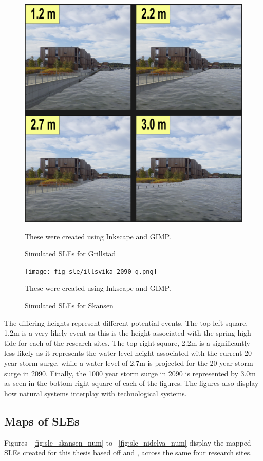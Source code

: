\begin{figure}[H]
    \centering
    \includegraphics[width=16cm]{fig_sle/grillstad 2090 q.png}
    \caption{Simulated SLEs for Grillstad}{These were created using Inkscape and GIMP. }
    \label{fig:SLE-grillstad}
\end{figure}

\begin{figure}[H]
    \centering
    \texttt{[image: fig\_sle/illsvika 2090 q.png]}
    \caption{Simulated SLEs for Skansen}{These were created using Inkscape and GIMP. }
    \label{fig:sle-skansen}
\end{figure}


The differing heights represent different potential events. The top left square, 1.2m is a very likely event as this is the height associated with the spring high tide for each of the research sites. The top right square, 2.2m is a significantly less likely as it represents the water level height associated with the current 20 year storm surge, while a water level of 2.7m is projected for the 20 year storm surge in 2090. Finally, the 1000 year storm surge in 2090 is represented by 3.0m as seen in the bottom right square of each of the figures. The figures also display how natural systems interplay with technological systems.

\subsection{Maps of SLEs}
Figures ~\ref{fig:sle_skansen_num} to ~\ref{fig:sle_nidelva_num}  display the mapped SLEs created for this thesis based off \cite{kartverket_se_2020} and \cite{stormflo_database_stormflo_2021}, across the same four research sites.

